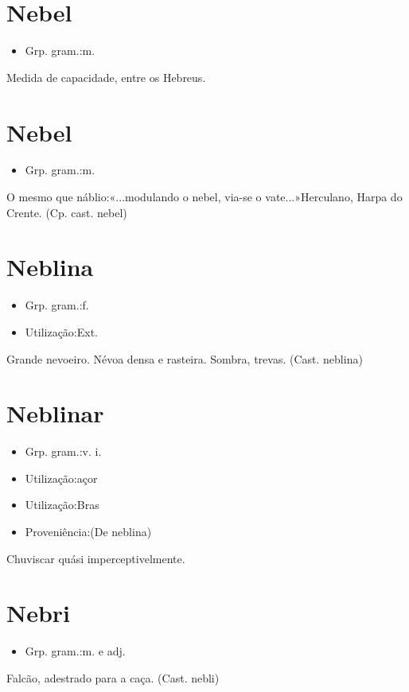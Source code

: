 \section{Nebel}
\begin{itemize}
\item {Grp. gram.:m.}
\end{itemize}
Medida de capacidade, entre os Hebreus.
\section{Nebel}
\begin{itemize}
\item {Grp. gram.:m.}
\end{itemize}
O mesmo que \textunderscore náblio\textunderscore :«\textunderscore ...modulando o nebel, via-se o vate...\textunderscore »Herculano, \textunderscore Harpa do Crente\textunderscore .
(Cp. cast. \textunderscore nebel\textunderscore )
\section{Neblina}
\begin{itemize}
\item {Grp. gram.:f.}
\end{itemize}
\begin{itemize}
\item {Utilização:Ext.}
\end{itemize}
Grande nevoeiro.
Névoa densa e rasteira.
Sombra, trevas.
(Cast. \textunderscore neblina\textunderscore )
\section{Neblinar}
\begin{itemize}
\item {Grp. gram.:v. i.}
\end{itemize}
\begin{itemize}
\item {Utilização:açor}
\end{itemize}
\begin{itemize}
\item {Utilização:Bras}
\end{itemize}
\begin{itemize}
\item {Proveniência:(De \textunderscore neblina\textunderscore )}
\end{itemize}
Chuviscar quási imperceptivelmente.
\section{Nebri}
\begin{itemize}
\item {Grp. gram.:m.  e  adj.}
\end{itemize}
Falcão, adestrado para a caça.
(Cast. \textunderscore nebli\textunderscore )
